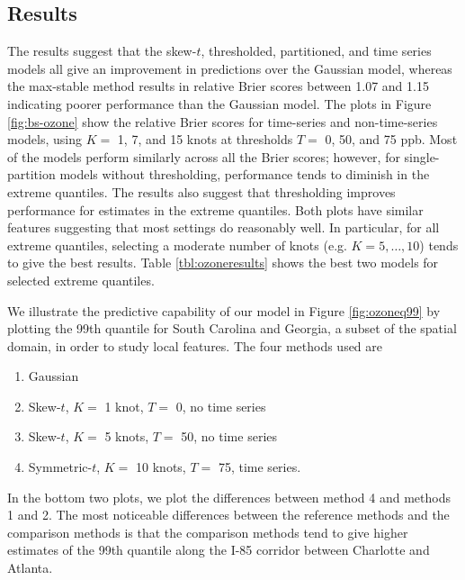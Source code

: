 \documentclass[useAMS,usenatbib,referee]{biom}
\begin{document}
\subsection{Results}\label{s:results}
The results suggest that the skew-$t$, thresholded, partitioned, and time series models all give an improvement in predictions over the Gaussian model, whereas the max-stable method results in relative Brier scores between 1.07 and 1.15 indicating poorer performance than the Gaussian model.
The plots in Figure \ref{fig:bs-ozone} show the relative Brier scores for time-series and non-time-series models, using $K = $ 1, 7, and 15 knots at thresholds $T = $ 0, 50, and 75 ppb.
Most of the models perform similarly across all the Brier scores; however, for single-partition models without thresholding, performance tends to diminish in the extreme quantiles.
The results also suggest that thresholding improves performance for estimates in the extreme quantiles.
Both plots have similar features suggesting that most settings do reasonably well.
In particular, for all extreme quantiles, selecting a moderate number of knots (e.g. $K = 5, \ldots, 10$) tends to give the best results.
Table \ref{tbl:ozoneresults} shows the best two models for selected extreme quantiles.

We illustrate the predictive capability of our model in Figure \ref{fig:ozoneq99} by plotting the 99th quantile for South Carolina and Georgia, a subset of the spatial domain, in order to study local features.
The four methods used are
\begin{enumerate}[leftmargin=3em]
  \item Gaussian
  \item Skew-$t$, $K =$ 1 knot, $T = $ 0, no time series
  \item Skew-$t$, $K =$ 5 knots, $T = $ 50, no time series
  \item Symmetric-$t$, $K =$ 10 knots, $T = $ 75, time series.
\end{enumerate}
In the bottom two plots, we plot the differences between method 4 and methods 1 and 2.
The most noticeable differences between the reference methods and the comparison methods is that the comparison methods tend to give higher estimates of the 99th quantile along the I-85 corridor between Charlotte and Atlanta.
\end{document}
